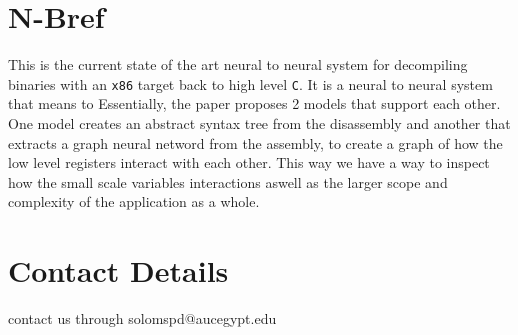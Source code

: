 \documentclass{article}
\begin{document}
\section{N-Bref}

This is the current state of the art neural to neural system for decompiling binaries with an \verb|x86| target back to high level \verb|C|.
It is a neural to neural system that means to 
Essentially, the paper proposes 2 models that support each other.
One model creates an abstract syntax tree from the disassembly and another that extracts a graph neural netword from the assembly, to create a graph of how the low level registers interact with each other.
This way we have a way to inspect how the small scale variables interactions aswell as the larger scope and complexity of the application as a whole.

\section{Contact Details}
contact us through solomspd@aucegypt.edu
\end{document}
